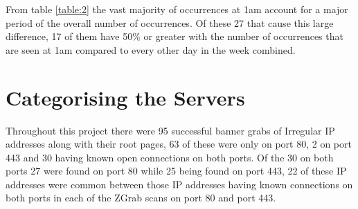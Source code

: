 \documentclass[a4wide,leqno,12pt]{report}
\begin{document}
From table \ref{table:2} the vast majority of occurrences at 1am account for a major period of the overall number of occurrences. Of these 27 that cause this large difference, 17 of them have 50\% or greater with the number of occurrences that are seen at 1am compared to every other day in the week combined.
\section{Categorising the Servers}
\begin{table}[H]
\centering
{}
\caption{Categorises of Irregular IP addresses}
\label{table:category}
\end{table}

Throughout this project there were 95 successful banner grabs of Irregular IP addresses along with their root pages, 63 of these were only on port 80, 2 on port 443 and 30 having known open connections on both ports. Of the 30 on both ports 27 were found on port 80 while 25 being found on port 443, 22 of these IP addresses were common between those IP addresses having known connections on both ports in each of the ZGrab scans on port 80 and port 443.\\
\end{document}
